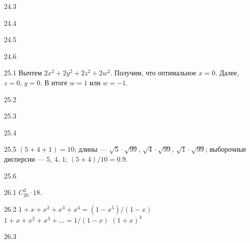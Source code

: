 \protect \hypertarget {soln:24.3}{}
\begin{solution}{{24.3}}

\end{solution}
\protect \hypertarget {soln:24.4}{}
\begin{solution}{{24.4}}

\end{solution}
\protect \hypertarget {soln:24.5}{}
\begin{solution}{{24.5}}

\end{solution}
\protect \hypertarget {soln:24.6}{}
\begin{solution}{{24.6}}

\end{solution}
\protect \hypertarget {soln:25.1}{}
\begin{solution}{{25.1}}
Вычтем $2x^2 + 2y^2 + 2z^2 + 2w^2$. Получим, что оптимальное $x=0$. Далее, $z=0$, $y=0$. В итоге $w=1$ или $w=-1$.
\end{solution}
\protect \hypertarget {soln:25.2}{}
\begin{solution}{{25.2}}

\end{solution}
\protect \hypertarget {soln:25.3}{}
\begin{solution}{{25.3}}
\end{solution}
\protect \hypertarget {soln:25.4}{}
\begin{solution}{{25.4}}
\end{solution}
\protect \hypertarget {soln:25.5}{}
\begin{solution}{{25.5}}
$(5+4+1)=10$; длины — $\sqrt{5}\cdot\sqrt{99}$, $\sqrt{4}\cdot\sqrt{99}$, $\sqrt{1}\cdot\sqrt{99}$; выборочные дисперсии — $5$, $4$, $1$; $(5+4)/10=0.9$.
\end{solution}
\protect \hypertarget {soln:25.6}{}
\begin{solution}{{25.6}}
\end{solution}
\protect \hypertarget {soln:26.1}{}
\begin{solution}{{26.1}}
$C_{20}^2\cdot 18$.
\end{solution}
\protect \hypertarget {soln:26.2}{}
\begin{solution}{{26.2}}
  $1+x+x^2+x^3+x^4=(1-x^5)/(1-x)$
  $1+x+x^2+x^3+\ldots = 1/(1-x)$
  $(1+x)^4$
\end{solution}
\protect \hypertarget {soln:26.3}{}
\begin{solution}{{26.3}}
\end{solution}
